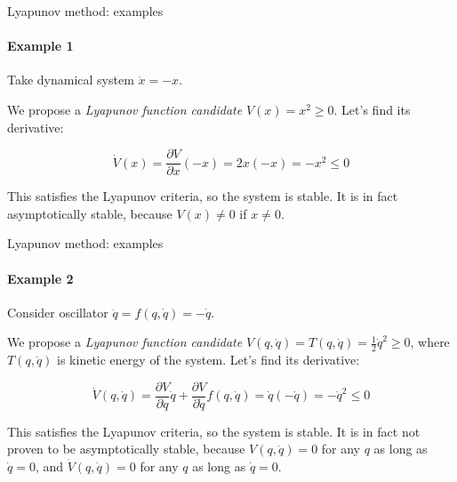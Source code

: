 \documentclass{beamer}
\begin{document}
\begin{frame}{Lyapunov method: examples}
\framesubtitle{Example 1}
\begin{flushleft}

Take dynamical system $\dot{x} = -x$. 

\bigskip

We propose a \emph{Lyapunov function candidate} $V(x) = x^2 \geq 0$. Let's find its derivative:

\begin{equation}
    \dot V(x) = \frac{\partial V}{\partial x} (-x) = 2x (-x) = -x^2 \leq 0
\end{equation}

This satisfies the Lyapunov criteria, so the system is stable. It is in fact asymptotically stable, because $V(x) \neq 0$ if $x \neq 0$.

\end{flushleft}
\end{frame}



\begin{frame}{Lyapunov method: examples}
\framesubtitle{Example 2}
\begin{flushleft}

Consider oscillator $\ddot{q} = f(q, \dot{q}) = -\dot{q}$. 

\bigskip

We propose a \emph{Lyapunov function candidate} $V(q, \dot{q}) = T(q, \dot{q}) = \frac{1}{2} \dot{q}^2 \geq 0$, where $T(q, \dot{q})$ is kinetic energy of the system. Let's find its derivative:

\begin{equation}
    \dot V(q, \dot{q}) = 
    \frac{\partial V}{\partial q}       \dot{q} +
    \frac{\partial V}{\partial \dot{q}} f(q, \dot{q}) = 
    \dot{q} (-\dot{q}) = -\dot{q}^2 \leq 0
\end{equation}


This satisfies the Lyapunov criteria, so the system is stable. It is in fact not proven to be asymptotically stable, because $V(q, \dot{q}) = 0$ for any $q$ as long as $\dot{q} = 0$, and $\dot V(q, \dot{q}) = 0$ for any $q$ as long as $\dot{q} = 0$.

\end{flushleft}
\end{frame}
\end{document}
